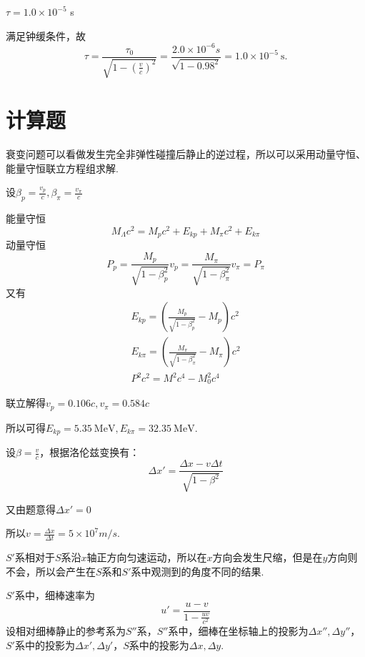 \documentclass[b5paper,opensource,sourcefont,parskip]{qyxf-book}
\begin{document}
$\tau=1.0\times10^{-5}$ s

\solve
满足钟缓条件，故
\begin{equation*}
\tau=\frac{\tau_0}{\sqrt{1-(\frac{v}{c})^2}}=\frac{2.0\times10^{-6}s}{\sqrt{1-0.98^2}}=1.0\times10^{-5}\ \mathrm{s}.
\end{equation*}


\section{计算题}

\analysis
衰变问题可以看做发生完全非弹性碰撞后静止的逆过程，所以可以采用动量守恒、能量守恒联立方程组求解.

\solve 
设$\beta_p=\frac{v_p}{c},\beta_\pi=\frac{v_\pi}{c}$

能量守恒
\begin{equation*}
M_\Lambda c^2=M_pc^2+E_{kp}+M_\pi c^2+E_{k\pi}
\end{equation*}
动量守恒
\begin{equation*}
P_p=\frac{M_p}{\sqrt{1-\beta_p^2}}v_p=\frac{M_\pi}{\sqrt{1-\beta_\pi^2}}v_\pi=P_\pi
\end{equation*}
又有
\begin{align*}
E_{kp}=(\frac{M_p}{\sqrt{1-\beta_p^2}}-M_p)c^2\\
E_{k\pi}=(\frac{M_\pi}{\sqrt{1-\beta_\pi^2}}-M_\pi)c^2\\
P^2c^2=M^2c^4-M_0^2c^4
\end{align*}

联立解得$v_p=0.106c,v_\pi=0.584c$

所以可得$E_{kp}=5.35\ \mathrm{MeV},E_{k\pi}=32.35\ \mathrm{MeV}$.


\solve 
设$\beta=\frac{v}{c}$，根据洛伦兹变换有：
\begin{equation*}
\Delta x'=\frac{\Delta x-v\Delta t}{\sqrt{1-\beta^2}}
\end{equation*}

又由题意得$\Delta x'=0$

所以$v=\frac{\Delta x}{\Delta t}=5\times10^7m/s$.


\analysis
$S'$系相对于$S$系沿$x$轴正方向匀速运动，所以在$x$方向会发生尺缩，但是在$y$方向则不会，所以会产生在$S$系和$S'$系中观测到的角度不同的结果.

\solve
$S'$系中，细棒速率为
\begin{equation*}
u'=\frac{u-v}{1-\frac{uv}{c^2}}
\end{equation*}
设相对细棒静止的参考系为$S''$系，$S''$系中，细棒在坐标轴上的投影为$\Delta x'',\Delta y''$，$S'$系中的投影为$\Delta x',\Delta y'$，$S$系中的投影为$\Delta x,\Delta y$.
\end{document}
